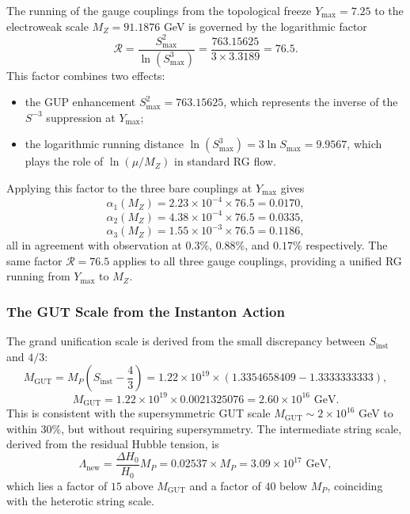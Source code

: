 \documentclass[a4paper,1pt,oneside,openany]{book}
\begin{document}
The running of the gauge couplings from the topological freeze $Y_{\max} = 7.25$ to the electroweak scale $M_Z = 91.1876$ GeV is governed by the logarithmic factor
\begin{equation}
\boxed{\mathcal{R} = \frac{S_{\max}^2}{\ln(S_{\max}^3)} = \frac{763.15625}{3 \times 3.3189} = 76.5.}
\label{eq:R-factor}
\end{equation}
This factor combines two effects:
\begin{itemize}
\item the GUP enhancement $S_{\max}^2 = 763.15625$, which represents the inverse of the $S^{-3}$ suppression at $Y_{\max}$;
\item the logarithmic running distance $\ln(S_{\max}^3) = 3 \ln S_{\max} = 9.9567$, which plays the role of $\ln(\mu/M_Z)$ in standard RG flow.
\end{itemize}
Applying this factor to the three bare couplings at $Y_{\max}$ gives
\begin{equation}
\alpha_1(M_Z) = 2.23 \times 10^{-4} \times 76.5 = 0.0170,
\label{eq:run1}
\end{equation}
\begin{equation}
\alpha_2(M_Z) = 4.38 \times 10^{-4} \times 76.5 = 0.0335,
\label{eq:run2}
\end{equation}
\begin{equation}
\alpha_3(M_Z) = 1.55 \times 10^{-3} \times 76.5 = 0.1186,
\label{eq:run3}
\end{equation}
all in agreement with observation at $0.3\%$, $0.88\%$, and $0.17\%$ respectively. The same factor $\mathcal{R} = 76.5$ applies to all three gauge couplings, providing a unified RG running from $Y_{\max}$ to $M_Z$.

\subsubsection{The GUT Scale from the Instanton Action}

The grand unification scale is derived from the small discrepancy between $S_{\mathrm{inst}}$ and $4/3$:
\begin{equation}
M_{\mathrm{GUT}} = M_P \left(S_{\mathrm{inst}} - \frac{4}{3}\right) = 1.22 \times 10^{19} \times (1.3354658409 - 1.3333333333),
\label{eq:MGUT-def}
\end{equation}
\begin{equation}
M_{\mathrm{GUT}} = 1.22 \times 10^{19} \times 0.0021325076 = 2.60 \times 10^{16} \text{ GeV}.
\label{eq:MGUT-num}
\end{equation}
This is consistent with the supersymmetric GUT scale $M_{\mathrm{GUT}} \sim 2 \times 10^{16}$ GeV to within $30\%$, but without requiring supersymmetry. The intermediate string scale, derived from the residual Hubble tension, is
\begin{equation}
\Lambda_{\mathrm{new}} = \frac{\Delta H_0}{H_0} M_P = 0.02537 \times M_P = 3.09 \times 10^{17} \text{ GeV},
\label{eq:Lambdanew}
\end{equation}
which lies a factor of $15$ above $M_{\mathrm{GUT}}$ and a factor of $40$ below $M_P$, coinciding with the heterotic string scale.
\end{document}

